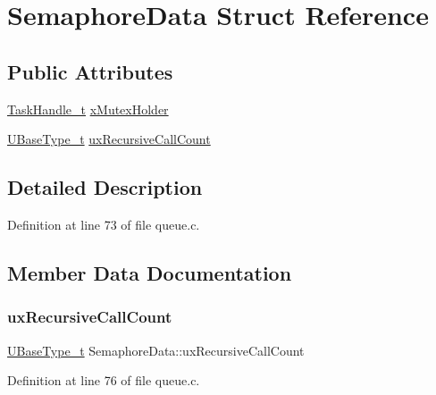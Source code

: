 \hypertarget{structSemaphoreData}{}\section{Semaphore\+Data Struct Reference}
\label{structSemaphoreData}
\subsection*{Public Attributes}
\begin{DoxyCompactItemize}
\item 
\hyperlink{task_8h_a25b35e6e19ecf894173e7ff95edb96ef}{Task\+Handle\+\_\+t} \hyperlink{structSemaphoreData_ab1ed54c7b39dc45b3c310fae7ad08693}{x\+Mutex\+Holder}
\item 
\hyperlink{pic32mx_2portmacro_8h_a646f89d4298e4f5afd522202b11cb2e6}{U\+Base\+Type\+\_\+t} \hyperlink{structSemaphoreData_aa428fcfc6e5831d054234444fde56574}{ux\+Recursive\+Call\+Count}
\end{DoxyCompactItemize}


\subsection{Detailed Description}


Definition at line 73 of file queue.\+c.



\subsection{Member Data Documentation}
\mbox{\label{structSemaphoreData_aa428fcfc6e5831d054234444fde56574}} 
\subsubsection{\texorpdfstring{ux\+Recursive\+Call\+Count}{uxRecursiveCallCount}}
{\footnotesize\ttfamily \hyperlink{pic32mx_2portmacro_8h_a646f89d4298e4f5afd522202b11cb2e6}{U\+Base\+Type\+\_\+t} Semaphore\+Data\+::ux\+Recursive\+Call\+Count}



Definition at line 76 of file queue.\+c.

\mbox{\label{structSemaphoreData_ab1ed54c7b39dc45b3c310fae7ad08693}} 
